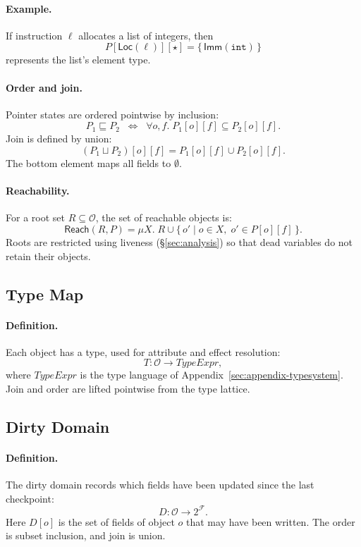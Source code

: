 \paragraph{Example.}
If instruction $\ell$ allocates a list of integers,
then
\[
P[\mathsf{Loc}(\ell)][\star] = \{\, \mathsf{Imm}(\texttt{int}) \,\}
\]
represents the list’s element type.

\paragraph{Order and join.}
Pointer states are ordered pointwise by inclusion:
\[
P_1 \sqsubseteq P_2 \;\;\iff\;\;
\forall o,f.\; P_1[o][f] \subseteq P_2[o][f].
\]
Join is defined by union:
\[
(P_1 \sqcup P_2)[o][f] = P_1[o][f] \cup P_2[o][f].
\]
The bottom element maps all fields to $\emptyset$.

\paragraph{Reachability.}
For a root set $R \subseteq \mathcal{O}$,
the set of reachable objects is:
\[
\mathsf{Reach}(R,P) = \mu X.\; R \cup \{\, o' \mid o \in X,\; o' \in P[o][f] \,\}.
\]
Roots are restricted using liveness (\S\ref{sec:analysis})
so that dead variables do not retain their objects.

\subsection{Type Map}

\paragraph{Definition.}
Each object has a type, used for attribute and effect resolution:
\[
T : \mathcal{O} \to \mathit{TypeExpr},
\]
where $\mathit{TypeExpr}$ is the type language of
Appendix~\ref{sec:appendix-typesystem}.
Join and order are lifted pointwise from the type lattice.

\subsection{Dirty Domain}

\paragraph{Definition.}
The dirty domain records which fields have been updated since the last checkpoint:
\[
D : \mathcal{O} \to 2^{\mathcal{F}}.
\]
Here $D[o]$ is the set of fields of object $o$ that may have been written.
The order is subset inclusion, and join is union.

